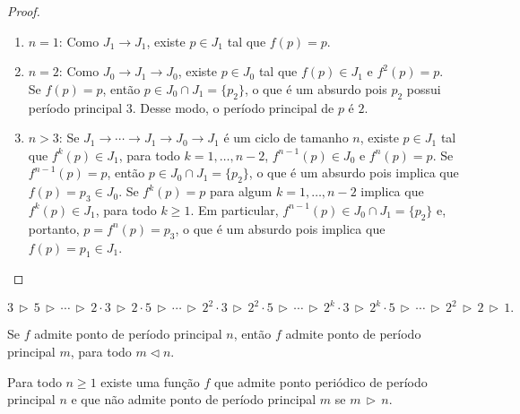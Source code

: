\begin{proof}
\begin{enumerate}[label=\alph*.]
\item $n = 1$: Como $J_1 \longrightarrow J_1$, existe $p \in J_1$ tal que $f(p) = p$.
\item $n = 2$: Como $J_0 \longrightarrow J_1 \longrightarrow J_0$, existe $p \in J_0$ tal que $f(p) \in J_1$ e $f^2(p) = p$. Se $f(p) = p$, então $p \in J_0 \cap J_1 = \{p_2\}$, o que é um absurdo pois $p_2$ possui período principal 3. Desse modo, o período principal de $p$ é $2$.
\item $n > 3$: Se $J_1 \longrightarrow \cdots \longrightarrow J_1 \longrightarrow J_0 \longrightarrow J_1$ é um ciclo de tamanho $n$, existe $p \in J_1$ tal que $f^k(p) \in J_1$, para todo $k = 1, \dots, n-2$, $f^{n-1}(p) \in J_0$ e $f^n(p) = p$. Se $f^{n-1}(p) = p$, então $p \in J_0 \cap J_1 = \{p_2\}$, o que é um absurdo pois implica que $f(p) = p_3 \in J_0$. Se $f^k(p) = p$ para algum $k = 1, \dots, n-2$ implica que $f^k(p) \in J_1$, para todo $k \geq 1$. Em particular, $f^{n-1}(p) \in J_0 \cap J_1 = \{p_2\}$ e, portanto, $p = f^n(p) = p_3$, o que é um absurdo pois implica que $f(p) = p_1 \in J_1$. 
\end{enumerate}
\end{proof}

\begin{definition}
$$3 \,\triangleright\, 5 
\,\triangleright\, \cdots \,\triangleright\,
2 \cdot 3 \,\triangleright\, 2 \cdot 5 
\,\triangleright\, \cdots \,\triangleright\,
2^2 \cdot 3 \,\triangleright\, 2^2 \cdot 5
\,\triangleright\, \cdots \,\triangleright\,
2^k \cdot 3 \,\triangleright\, 2^k \cdot 5
\,\triangleright\, \cdots \,\triangleright\,
2^2 \,\triangleright\, 2 \,\triangleright\, 1.$$
\end{definition}

\begin{theorem}[Sharkovsky]
Se $f$ admite ponto de período principal $n$, então $f$ admite ponto de período principal $m$, para todo $m \triangleleft n$.
\end{theorem}

\begin{theorem}
Para todo $n \geq 1$ existe uma função $f$ que admite ponto periódico de período principal $n$ e que não admite ponto de período principal $m$ se $m \,\triangleright\, n$.
\end{theorem}

